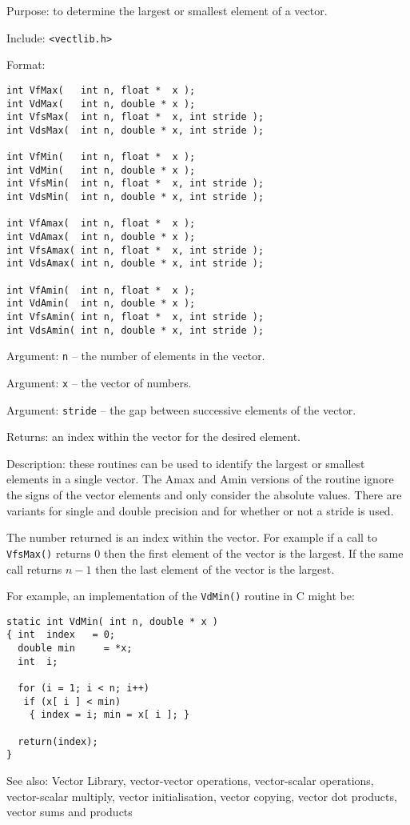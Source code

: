 
Purpose: to determine the largest or smallest element of a vector.

Include: \verb+<vectlib.h>+

Format: 

\begin{verbatim}
int VfMax(   int n, float *  x );
int VdMax(   int n, double * x );
int VfsMax(  int n, float *  x, int stride );
int VdsMax(  int n, double * x, int stride );

int VfMin(   int n, float *  x );
int VdMin(   int n, double * x );
int VfsMin(  int n, float *  x, int stride );
int VdsMin(  int n, double * x, int stride );

int VfAmax(  int n, float *  x );
int VdAmax(  int n, double * x );
int VfsAmax( int n, float *  x, int stride );
int VdsAmax( int n, double * x, int stride );

int VfAmin(  int n, float *  x );
int VdAmin(  int n, double * x );
int VfsAmin( int n, float *  x, int stride );
int VdsAmin( int n, double * x, int stride );
\end{verbatim}

Argument: {\tt n} -- the number of elements in the vector.

Argument: {\tt x} -- the vector of numbers.

Argument: {\tt stride} -- the gap between successive elements of the vector.

Returns: an index within the vector for the desired element.

Description: these routines can be used to identify the largest or smallest
elements in a single vector. The Amax and Amin versions of the routine
ignore the signs of the vector elements and only consider the absolute
values. There are variants for single and double precision and for
whether or not a stride is used.

The number returned is an index within the vector. For example if a call
to {\tt VfsMax()} returns 0 then the first element of the vector is
the largest. If the same call returns $n - 1$ then the last element of the
vector is the largest.

For example, an implementation of the {\tt VdMin()} routine in C might be:

\begin{verbatim}
static int VdMin( int n, double * x )
{ int  index   = 0;
  double min     = *x;
  int  i;

  for (i = 1; i < n; i++)
   if (x[ i ] < min)
    { index = i; min = x[ i ]; }

  return(index);
}
\end{verbatim}

See also: Vector Library, vector-vector operations, vector-scalar
operations, vector-scalar multiply, vector initialisation, vector
copying, vector dot products, vector sums and products





